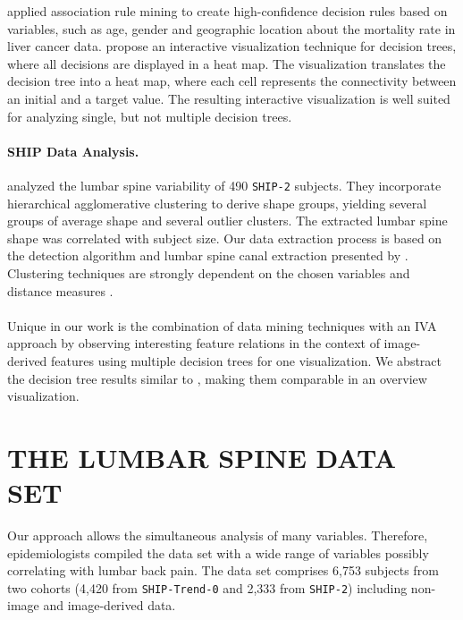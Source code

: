\documentclass[a4paper,twoside]{style/article}
\begin{document}
\cite{Pinheiro} applied association rule mining to create high-confidence decision rules based on variables, such as age, gender and geographic location about the mortality rate in liver cancer data.
\cite{Sekhavat} propose an interactive visualization technique for decision trees, where all decisions are displayed in a heat map.
The visualization translates the decision tree into a heat map, where each cell represents the connectivity between an initial and a target value.
The resulting interactive visualization is well suited for analyzing single, but not multiple decision trees.
\paragraph{SHIP Data Analysis.}
\cite{Klemm2013VMV} analyzed the lumbar spine variability of 490 \texttt{SHIP-2} subjects.
They incorporate hierarchical agglomerative clustering to derive shape groups, yielding several groups of average shape and several outlier clusters.
The extracted lumbar spine shape was correlated with subject size.
Our data extraction process is based on the detection algorithm and lumbar spine canal extraction presented by \cite{Klemm2013VMV}.
Clustering techniques are strongly dependent on the chosen variables and distance measures \cite{Klemm2014BVM}.
\\\\
Unique in our work is the combination of data mining techniques with an IVA approach by observing interesting feature relations in the context of image-derived features using multiple decision trees for one visualization.
We abstract the decision tree results similar to \cite{Turkay}, making them comparable in an overview visualization.
\section{\uppercase{The Lumbar Spine Data Set}}
\label{sec:MaterialsAndMethod}
\noindent Our approach allows the simultaneous analysis of many variables.
Therefore, epidemiologists compiled the data set with a wide range of variables possibly correlating with lumbar back pain.
The data set comprises 6,753 subjects from two cohorts (4,420 from \texttt{SHIP-Trend-0} and 2,333 from \texttt{SHIP-2}) including non-image and image-derived data.
\end{document}
